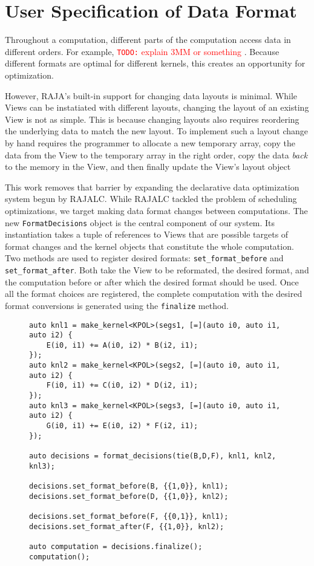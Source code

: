 \documentclass[sigconf, table]{acmart}
\newcommand{\todo}[1]{{\textcolor{red}{{\tt{TODO:}}\,\,#1 }}}
\begin{document}
\section{User Specification of Data Format}

Throughout a computation, different parts of the computation access data in different orders.
For example, \todo{explain 3MM or something}.
Because different formats are optimal for different kernels, this creates an opportunity for optimization. 

However, RAJA's built-in support for changing data layouts is minimal. 
While Views can be instatiated with different layouts, changing the layout of an existing View is not as simple.
This is because changing layouts also requires reordering the underlying data to match the new layout. 
To implement such a layout change by hand requires the programmer to allocate a new temporary array, 
copy the data from the View to the temporary array in the right order, 
copy the data \textit{back} to the memory in the View, 
and then finally update the View's layout object

This work removes that barrier by expanding the declarative data optimization system begun by RAJALC.
While RAJALC tackled the problem of scheduling optimizations, we target making data format changes between computations. 
The new \verb.FormatDecisions. object is the central component of our system. 
Its instantiation takes a tuple of references to Views that are possible targets of format changes and the kernel objects that constitute the whole computation.
Two methods are used to register desired formats: \verb.set_format_before. and \verb.set_format_after..
Both take the View to be reformated, the desired format, and the computation before or after which the desired format should be used.
Once all the format choices are registered, the complete computation with the desired format conversions is generated using the \verb.finalize. method.


\begin{figure}
\begin{lstlisting}[caption={The 3MM benchmark implemented using FormatDecisions.},
	label={FormatDecisions3MM}]
auto knl1 = make_kernel<KPOL>(segs1, [=](auto i0, auto i1, auto i2) {
	E(i0, i1) += A(i0, i2) * B(i2, i1);
});
auto knl2 = make_kernel<KPOL>(segs2, [=](auto i0, auto i1, auto i2) {
	F(i0, i1) += C(i0, i2) * D(i2, i1);
});
auto knl3 = make_kernel<KPOL>(segs3, [=](auto i0, auto i1, auto i2) {
	G(i0, i1) += E(i0, i2) * F(i2, i1);
});

auto decisions = format_decisions(tie(B,D,F), knl1, knl2, knl3);

decisions.set_format_before(B, {{1,0}}, knl1);
decisions.set_format_before(D, {{1,0}}, knl2);

decisions.set_format_before(F, {{0,1}}, knl1);
decisions.set_format_after(F, {{1,0}}, knl2);

auto computation = decisions.finalize();
computation();
\end{lstlisting}
\end{figure}
\end{document}
